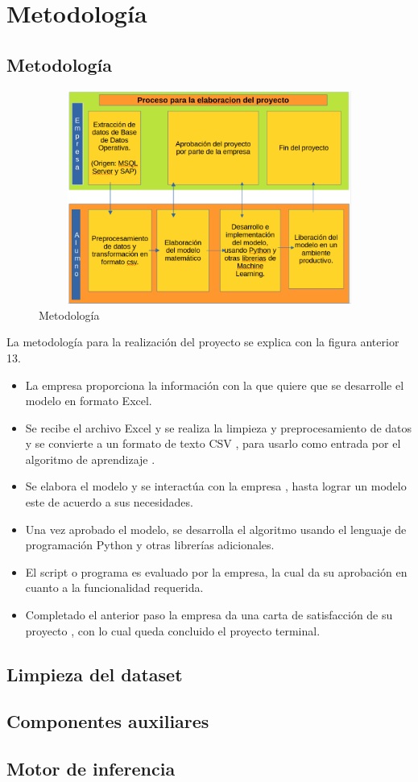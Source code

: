 \chapter{Metodología}\label{cap4:Metodologia}

\section{Metodología}

\begin{figure}[H]
    \centering
       \includegraphics[width=12cm, height=7cm ]{Imagenes/Proceso_Proyecto.PNG }
      \caption{Metodología}
      \label{fig:meto}
  \end{figure}

La metodología para la realización del proyecto se explica con la figura anterior 13.

\begin{itemize}
    \item La empresa proporciona la información con la que quiere que se desarrolle el modelo en formato Excel. \medskip
    \item Se recibe el archivo Excel y se realiza la limpieza y preprocesamiento de datos y se convierte a un formato de texto CSV , para usarlo como entrada por el algoritmo de aprendizaje . \medskip
    \item Se elabora el modelo y se interactúa con la empresa , hasta lograr un modelo este de acuerdo a sus necesidades. \medskip
    \item Una vez aprobado el modelo, se desarrolla el algoritmo usando el lenguaje de programación Python y otras librerías adicionales.\medskip
    \item El script o programa es evaluado por la empresa, la cual da su aprobación en cuanto a la funcionalidad requerida. \medskip
    \item Completado el anterior paso la empresa da una carta de satisfacción de su proyecto , con lo cual queda concluido el proyecto terminal. \medskip
    
\end{itemize}


 
\section{Limpieza del dataset}

\section{Componentes auxiliares}

\section{Motor de inferencia}
